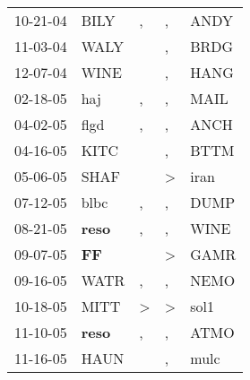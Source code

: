 \begin{supertabular}{p{0.07\textwidth}p{0.06\textwidth}p{0.02\textwidth}p{0.02\textwidth}p{0.06\textwidth}}
          10-21-04\textsuperscript{} &           BILY\textsuperscript{} &                , &                , &           ANDY\textsuperscript{} \\
          11-03-04\textsuperscript{} &           WALY\textsuperscript{} &                  &                , &           BRDG\textsuperscript{} \\
          12-07-04\textsuperscript{} &           WINE\textsuperscript{} &                  &                , &           HANG\textsuperscript{} \\
          02-18-05\textsuperscript{} &            haj\textsuperscript{} &                , &                , &           MAIL\textsuperscript{} \\
          04-02-05\textsuperscript{} &           flgd\textsuperscript{} &                , &                , &           ANCH\textsuperscript{} \\
          04-16-05\textsuperscript{} &           KITC\textsuperscript{} &                  &                , &           BTTM\textsuperscript{} \\
          05-06-05\textsuperscript{} &           SHAF\textsuperscript{} &                  &     \textgreater &           iran\textsuperscript{} \\
          07-12-05\textsuperscript{} &           blbc\textsuperscript{} &                , &                , &           DUMP\textsuperscript{} \\
          08-21-05\textsuperscript{} &  \textbf{reso\textsuperscript{}} &                , &                , &           WINE\textsuperscript{} \\
          09-07-05\textsuperscript{} &    \textbf{FF\textsuperscript{}} &                  &     \textgreater &           GAMR\textsuperscript{} \\
          09-16-05\textsuperscript{} &           WATR\textsuperscript{} &                , &                , &           NEMO\textsuperscript{} \\
          10-18-05\textsuperscript{} &           MITT\textsuperscript{} &     \textgreater &     \textgreater &           sol1\textsuperscript{} \\
          11-10-05\textsuperscript{} &  \textbf{reso\textsuperscript{}} &                , &                , &           ATMO\textsuperscript{} \\
          11-16-05\textsuperscript{} &           HAUN\textsuperscript{} &                  &                , &           mulc\textsuperscript{} \\

\end{supertabular}
